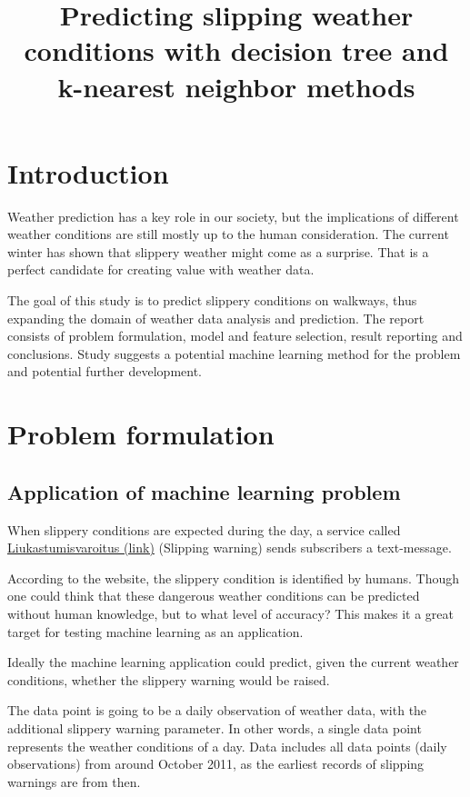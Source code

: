\documentclass[12pt, a4paper]{article}
\title{Predicting slipping weather conditions with decision tree and k-nearest neighbor methods}
\begin{document}
    \maketitle
    \section{Introduction}
    Weather prediction has a key role in our society, but the implications of different weather conditions
    are still mostly up to the human consideration. 
    The current winter has shown that slippery weather might come as a surprise. That is a perfect candidate
    for creating value with weather data.
    
    The goal of this study is to predict slippery conditions on walkways, thus expanding the domain of weather data analysis and prediction. 
    The report consists of problem formulation, model and feature selection, result reporting and conclusions.
    Study suggests a potential machine learning method for the problem and potential further development.
    \section{Problem formulation}
    \subsection{Application of machine learning problem}
    When slippery conditions are expected during the day, a service called \href{https://liukastumisvaroitus.fi/en/}{Liukastumisvaroitus (link)} (Slipping warning) sends subscribers a text-message.

    According to the website, the slippery condition is identified by humans.
    Though one could think that these dangerous weather conditions can be predicted without 
    human knowledge, but to what level of accuracy? This makes it a great target for testing machine learning as an application.
    
    Ideally the machine learning application could predict, given the current weather conditions, whether the slippery warning would be raised.

    The data point is going to be a daily observation of weather data, with the additional
    slippery warning parameter. In other words, a single data point represents the weather conditions of a day. Data includes all data points (daily observations) from around 
    October 2011, as the earliest records of slipping warnings are from then.
\end{document}
